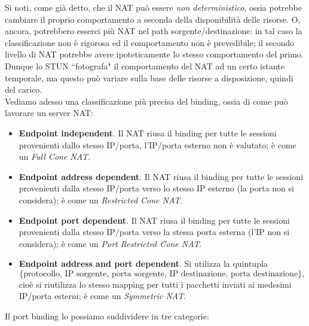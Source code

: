 Si noti, come già detto, che il NAT può essere \textit{non deterministico}, ossia potrebbe cambiare il proprio comportamento a seconda della disponibilità delle risorse. O, ancora, potrebbero esserci più NAT nel path sorgente/destinazione: in tal caso la classificazione non è rigorosa ed il comportamento non è prevedibile; il secondo livello di NAT potrebbe avere ipoteticamente lo stesso comportamento del primo. Dunque lo STUN \textquotedblleft fotografa" il comportamento del NAT ad un certo istante temporale, ma questo può variare sulla base delle risorse a disposizione, quindi del carico.\\
Vediamo adesso una classificazione più precisa del binding, ossia di come può lavorare un server NAT:
\begin{itemize}
	\item \textbf{Endpoint independent}. Il NAT riusa il binding per tutte le sessioni provenienti dallo stesso IP/porta, l'IP/porta esterno non è valutato; è come un \textit{Full Cone NAT}.
	
	\item \textbf{Endpoint address dependent}. Il NAT riusa il binding per tutte le sessioni provenienti dalla stesso IP/porta verso lo stesso IP esterno (la porta non si considera); è come un \textit{Restricted Cone NAT}.
	
	\item \textbf{Endpoint port dependent}. Il NAT riusa il binding per tutte le sessioni provenienti dalla stesso IP/porta verso la stessa porta esterna (l'IP non si considera); è come un \textit{Port Restricted Cone NAT}.
		
	\item \textbf{Endpoint address and port dependent}. Si utilizza la quintupla $$\{\text{protocollo, IP sorgente, porta sorgente, IP destinazione, porta destinazione}\},$$ cioè si riutilizza lo stesso mapping per tutti i pacchetti inviati ai medesimi IP/porta esterni; è come un \textit{Symmetric NAT}.
	
\end{itemize}
Il port binding lo possiamo suddividere in tre categorie:
